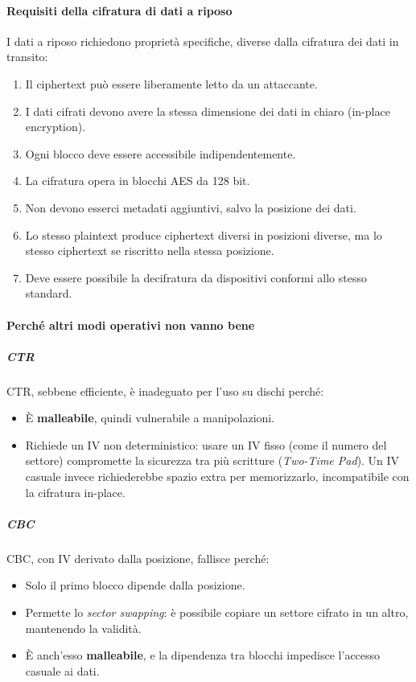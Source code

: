 \documentclass{report}
\begin{document}
\paragraph{Requisiti della cifratura di dati a riposo}

I dati a riposo richiedono proprietà specifiche, diverse dalla cifratura dei dati in transito:
\begin{enumerate}
    \item Il ciphertext può essere liberamente letto da un attaccante.
    \item I dati cifrati devono avere la stessa dimensione dei dati in chiaro (in-place encryption).
    \item Ogni blocco deve essere accessibile indipendentemente.
    \item La cifratura opera in blocchi AES da 128 bit.
    \item Non devono esserci metadati aggiuntivi, salvo la posizione dei dati.
    \item Lo stesso plaintext produce ciphertext diversi in posizioni diverse, ma lo stesso ciphertext se riscritto nella stessa posizione.
    \item Deve essere possibile la decifratura da dispositivi conformi allo stesso standard.
\end{enumerate}

\paragraph{Perché altri modi operativi non vanno bene}

\subparagraph{CTR}
CTR, sebbene efficiente, è inadeguato per l’uso su dischi perché:
\begin{itemize}
    \item È \textbf{malleabile}, quindi vulnerabile a manipolazioni.
    \item Richiede un IV non deterministico: usare un IV fisso (come il numero del settore) compromette la sicurezza tra più scritture (\textit{Two-Time Pad}). Un IV casuale invece richiederebbe spazio extra per memorizzarlo, incompatibile con la cifratura in-place.
\end{itemize}

\subparagraph{CBC}
CBC, con IV derivato dalla posizione, fallisce perché:
\begin{itemize}
    \item Solo il primo blocco dipende dalla posizione.
    \item Permette lo \textit{sector swapping}: è possibile copiare un settore cifrato in un altro, mantenendo la validità.
    \item È anch’esso \textbf{malleabile}, e la dipendenza tra blocchi impedisce l’accesso casuale ai dati.
\end{itemize}
\end{document}
